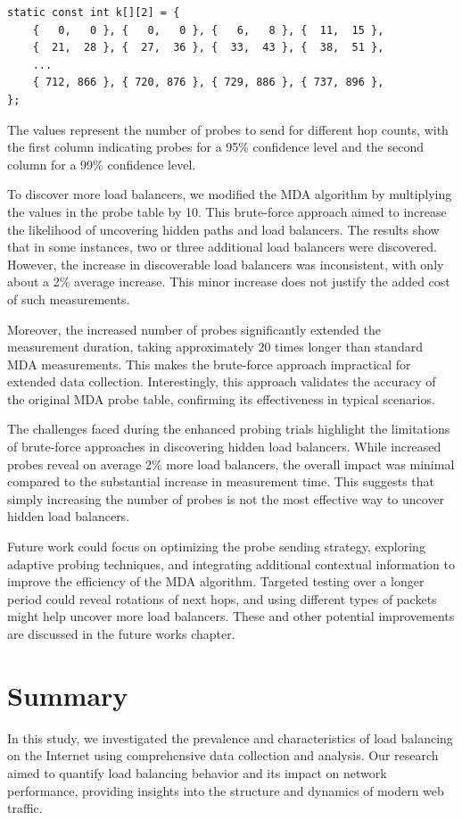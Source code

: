\documentclass[12pt]{cwru_thesis}
\begin{document}
\begin{verbatim}
static const int k[][2] = {
    {   0,   0 }, {   0,   0 }, {   6,   8 }, {  11,  15 },
    {  21,  28 }, {  27,  36 }, {  33,  43 }, {  38,  51 }, 
    ...
    { 712, 866 }, { 720, 876 }, { 729, 886 }, { 737, 896 }, 
};
\end{verbatim}

The values represent the number of probes to send for different hop counts, with the first column indicating probes for a 95\% confidence level and the second column for a 99\% confidence level.

To discover more load balancers, we modified the MDA algorithm by multiplying the values in the probe table by 10. This brute-force approach aimed to increase the likelihood of uncovering hidden paths and load balancers. The results show that in some instances, two or three additional load balancers were discovered. However, the increase in discoverable load balancers was inconsistent, with only about a 2\% average increase. This minor increase does not justify the added cost of such measurements.

Moreover, the increased number of probes significantly extended the measurement duration, taking approximately 20 times longer than standard MDA measurements. This makes the brute-force approach impractical for extended data collection. Interestingly, this approach validates the accuracy of the original MDA probe table, confirming its effectiveness in typical scenarios.

The challenges faced during the enhanced probing trials highlight the limitations of brute-force approaches in discovering hidden load balancers. While increased probes reveal on average 2\% more load balancers, the overall impact was minimal compared to the substantial increase in measurement time. This suggests that simply increasing the number of probes is not the most effective way to uncover hidden load balancers.

Future work could focus on optimizing the probe sending strategy, exploring adaptive probing techniques, and integrating additional contextual information to improve the efficiency of the MDA algorithm. Targeted testing over a longer period could reveal rotations of next hops, and using different types of packets might help uncover more load balancers. These and other potential improvements are discussed in the future works chapter.



\chapter{Summary}
In this study, we investigated the prevalence and characteristics of load balancing on the Internet using comprehensive data collection and analysis. Our research aimed to quantify load balancing behavior and its impact on network performance, providing insights into the structure and dynamics of modern web traffic.
\end{document}
